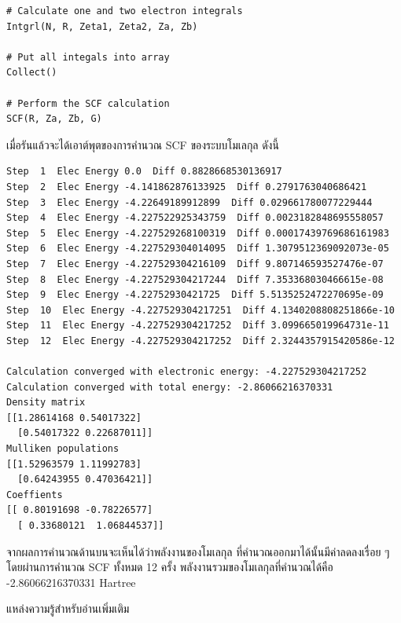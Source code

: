 \vspace{5pt}

\begin{lstlisting}[style=MyPython]
# Calculate one and two electron integrals
Intgrl(N, R, Zeta1, Zeta2, Za, Zb)

# Put all integals into array
Collect()

# Perform the SCF calculation
SCF(R, Za, Zb, G)
\end{lstlisting}

\vspace{5pt}

เมื่อรันแล้วจะได้เอาต์พุตของการคำนวณ SCF ของระบบโมเลกุล  ดังนี้

\vspace{5pt}

\begin{lstlisting}[style=MyPython]
Step  1  Elec Energy 0.0  Diff 0.8828668530136917
Step  2  Elec Energy -4.141862876133925  Diff 0.2791763040686421
Step  3  Elec Energy -4.22649189912899  Diff 0.029661780077229444
Step  4  Elec Energy -4.227522925343759  Diff 0.0023182848695558057
Step  5  Elec Energy -4.227529268100319  Diff 0.00017439769686161983
Step  6  Elec Energy -4.227529304014095  Diff 1.3079512369092073e-05
Step  7  Elec Energy -4.227529304216109  Diff 9.807146593527476e-07
Step  8  Elec Energy -4.227529304217244  Diff 7.353368030466615e-08
Step  9  Elec Energy -4.22752930421725  Diff 5.5135252472270695e-09
Step  10  Elec Energy -4.227529304217251  Diff 4.1340208808251866e-10
Step  11  Elec Energy -4.227529304217252  Diff 3.099665019964731e-11
Step  12  Elec Energy -4.227529304217252  Diff 2.3244357915420586e-12

Calculation converged with electronic energy: -4.227529304217252
Calculation converged with total energy: -2.86066216370331
Density matrix
[[1.28614168 0.54017322]
  [0.54017322 0.22687011]]
Mulliken populations
[[1.52963579 1.11992783]
  [0.64243955 0.47036421]]
Coeffients
[[ 0.80191698 -0.78226577]
  [ 0.33680121  1.06844537]]
\end{lstlisting}

\vspace{5pt}

จากผลการคำนวณด้านบนจะเห็นได้ว่าพลังงานของโมเลกุล  ที่คำนวณออกมาได้นั้นมีค่าลดลงเรื่อย ๆ โดยผ่านการคำนวณ SCF ทั้งหมด
12 ครั้ง พลังงานรวมของโมเลกุลที่คำนวณได้คือ -2.86066216370331 Hartree

\noindent แหล่งความรู้สำหรับอ่านเพิ่มเติม

